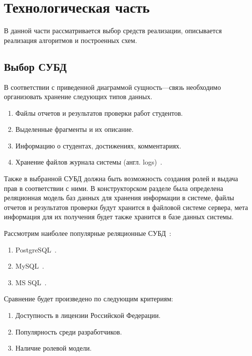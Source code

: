 \chapter{Технологическая часть}
В данной части рассматривается выбор средств реализации, описывается реализация
алгоритмов и построенных схем.

\section{Выбор СУБД}
В соответствии с приведенной диаграммой сущность---связь необходимо организовать
хранение следующих типов данных.
\begin{enumerate}
	\item Файлы отчетов и результатов проверки работ студентов.
	\item Выделенные фрагменты и их описание.
	\item Информацию о студентах, достижениях, комментариях.
	\item Хранение файлов журнала системы (англ. logs)~\cite{kuznecov-db}.
\end{enumerate}
Также в выбранной СУБД должна быть возможность создания ролей и выдача прав в
соответствии с ними.
В конструкторском разделе была определена реляционная модель баз данных для
хранения информации в системе, файлы отчетов и результатов проверки будут
хранится в файловой системе сервера, мета информация для их получения будет
также хранится в базе данных системы.

Рассмотрим наиболее популярные реляционные СУБД~\cite{sql_popular}:
\begin{enumerate}
	\item PostgreSQL~\cite{postgres,postgres_pro_cert}.
	\item MySQL~\cite{ms_sql_server}.
	\item MS SQL~\cite{mysql}.
\end{enumerate}

Сравнение будет произведено по следующим критериям:
\begin{enumerate}
	\item Доступность в лицензии Российской Федерации.
	\item Популярность среди разработчиков.
	\item Наличие ролевой модели.
\end{enumerate}


